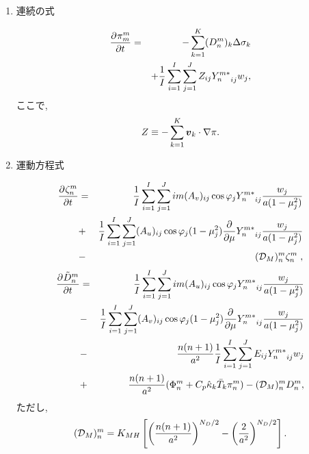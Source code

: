 \begin{enumerate}
\item 連続の式

\begin{eqnarray}
  \DP{\pi_m^m}{t}
 & = & - \sum_{k=1}^{K} (D_n^m)_k \Delta  \sigma_k \nonumber \\
 &   & + \frac{1}{I} \sum_{i=1}^{I} \sum_{j=1}^{J}  
               Z_{ij} {Y_n^{m *}}_{ij} w_j  ,
\end{eqnarray}
%
ここで,
\begin{equation}
Z \equiv - \sum_{k=1}^{K} \Dvect{v}_k \cdot \nabla \pi .
\end{equation}

\item 運動方程式

\begin{eqnarray}
  \DP{\zeta_n^m}{t} 
  & = & \frac{1}{I} \sum_{i=1}^{I} \sum_{j=1}^{J}  
          im (A_v)_{ij} \cos\varphi_j
          {Y_n^{m *}}_{ij}
         \frac{w_j}{a(1-\mu_j^{2})} 
         \nonumber \\
  & + &   \frac{1}{I} \sum_{i=1}^{I} \sum_{j=1}^{J}  
          (A_u)_{ij} \cos\varphi_j
          (1-\mu_j^2) 
          \frac{\partial }{\partial \mu} {Y_n^{m *}}_{ij}
          \frac{w_j}{a(1-\mu_j^{2})} 
         \nonumber \\ 
  & - &  ({\cal D}_M)_n^m \zeta_n^m  \; ,
\end{eqnarray}
%
\begin{eqnarray}
  \DP{\tilde{D}_n^m}{t} 
  & = & \frac{1}{I} \sum_{i=1}^{I} \sum_{j=1}^{J}  
          im (A_u)_{ij} \cos\varphi_j
          {Y_n^{m *}}_{ij}
         \frac{w_j}{a(1-\mu_j^{2})} 
         \nonumber \\
  & - &   \frac{1}{I} \sum_{i=1}^{I} \sum_{j=1}^{J}  
          (A_v)_{ij} \cos\varphi_j
          (1-\mu_j^2) 
          \frac{\partial }{\partial \mu} {Y_n^{m *}}_{ij}
          \frac{w_j}{a(1-\mu_j^{2})} 
         \nonumber \\
  & - &  \frac{n(n+1)}{a^{2}} 
         \frac{1}{I} \sum_{i=1}^{I} \sum_{j=1}^{J}  
          E_{ij} {Y_n^{m *}}_{ij} w_j
         \nonumber \\ 
  & + &  \frac{n(n+1)}{a^{2}} 
          ( \Phi_n^m + C_{p} \hat{\kappa}_k \bar{T}_k \pi_n^m ) 
          -  ({\cal D}_M)_n^m D_n^m  ,
\end{eqnarray}
%
ただし,
%
\begin{equation}
({\cal D}_M)_n^m = K_{MH} \left[ 
                            \left( \frac{n(n+1)}{a^{2}} \right)^{N_D/2}
                            - \left( \frac{2}{a^2} \right)^{N_D/2}
                            \right]  .
\end{equation}


\end{enumerate}

